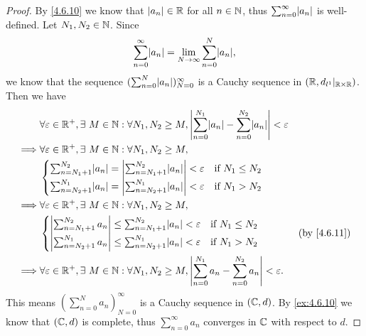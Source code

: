 \begin{proof}
  By \cref{4.6.10} we know that \(\left\lvert a_n\right\rvert \in \mathbb{R}\) for all \(n \in \mathbb{N}\), thus \(\sum_{n = 0}^\infty \abs{a_n}\) is well-defined.
  Let \(N_1, N_2 \in \mathbb{N}\).
  Since
  \[
    \sum_{n = 0}^\infty \abs{a_n} = \lim_{N \to \infty} \sum_{n = 0}^N \abs{a_n},
  \]
  we know that the sequence \((\sum_{n = 0}^N \abs{a_n})_{N = 0}^\infty\) is a Cauchy sequence in \((\mathbb{R}, d_{l^1}|_{\mathbb{R} \times \mathbb{R}})\).
  Then we have
  \begin{align*}
             & \forall \varepsilon \in \R^+, \exists\ M \in \N : \forall N_1, N_2 \geq M, \abs{\sum_{n = 0}^{N_1} \abs{a_n} - \sum_{n = 0}^{N_2} \abs{a_n}} < \varepsilon \\
    \implies & \forall \varepsilon \in \R^+, \exists\ M \in \N : \forall N_1, N_2 \geq M,                                                                                 \\
             & \begin{cases}
                 \sum_{n = N_1 + 1}^{N_2} \abs{a_n} = \abs{\sum_{n = N_1 + 1}^{N_2} \abs{a_n}} < \varepsilon & \text{if } N_1 \leq N_2 \\
                 \sum_{n = N_2 + 1}^{N_1} \abs{a_n} = \abs{\sum_{n = N_2 + 1}^{N_1} \abs{a_n}} < \varepsilon & \text{if } N_1 > N_2
               \end{cases}                       \\
    \implies & \forall \varepsilon \in \R^+, \exists\ M \in \N : \forall N_1, N_2 \geq M,                                                                                 \\
             & \begin{cases}
                 \abs{\sum_{n = N_1 + 1}^{N_2} a_n} \leq \sum_{n = N_1 + 1}^{N_2} \abs{a_n} < \varepsilon & \text{if } N_1 \leq N_2 \\
                 \abs{\sum_{n = N_2 + 1}^{N_1} a_n} \leq \sum_{n = N_2 + 1}^{N_1} \abs{a_n} < \varepsilon & \text{if } N_1 > N_2
               \end{cases}                                      & \text{(by \cref{4.6.11})}                                         \\
    \implies & \forall \varepsilon \in \R^+, \exists\ M \in \N : \forall N_1, N_2 \geq M, \abs{\sum_{n = 0}^{N_1} a_n - \sum_{n = 0}^{N_2} a_n} < \varepsilon.
  \end{align*}
  This means \((\sum_{n = 0}^N a_n)_{N = 0}^\infty\) is a Cauchy sequence in \((\mathbb{C}, d)\).
  By \cref{ex:4.6.10} we know that \((\mathbb{C}, d)\) is complete, thus \(\sum_{n = 0}^\infty a_n\) converges in \(\mathbb{C}\) with respect to \(d\).
\end{proof}

